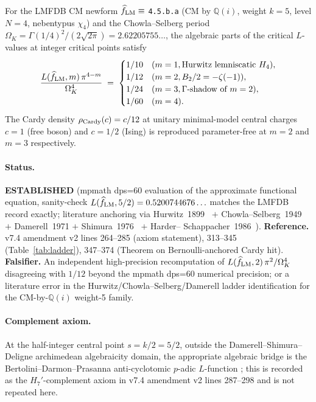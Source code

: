 \begin{axiom*}
For the LMFDB CM newform $\widehat f_{\rm LM} \equiv$
\texttt{4.5.b.a} (CM by $\mathbb{Q}(i)$, weight $k=5$, level $N=4$,
nebentypus $\chi_4$) and the Chowla--Selberg period $\Omega_K =
\Gamma(1/4)^2 / (2\sqrt{2\pi}) = 2.62205755\ldots$, the algebraic parts
of the critical $L$-values at integer critical points satisfy
\[
  \frac{L(\widehat f_{\rm LM},m) \, \pi^{4-m}}{\Omega_K^4} \;=\;
  \begin{cases}
    1/10  & (m=1, \text{Hurwitz lemniscatic } H_4),\\
    1/12  & (m=2, B_2/2 = -\zeta(-1)),\\
    1/24  & (m=3, \Gamma\text{-shadow of } m=2),\\
    1/60  & (m=4).
  \end{cases}
\]
The Cardy density $\rho_{\rm Cardy}(c) = c/12$ at unitary minimal-model
central charges $c=1$ (free boson) and $c=1/2$ (Ising) is reproduced
parameter-free at $m=2$ and $m=3$ respectively.
\end{axiom*}

\paragraph{Status.}  \textbf{ESTABLISHED} (mpmath dps=60 evaluation of
the approximate functional equation, sanity-check
$L(\widehat f_{\rm LM},5/2) = 0.5200744676\ldots$ matches the LMFDB
record exactly; literature anchoring via Hurwitz~1899~\cite{Hurwitz1899}
$+$ Chowla--Selberg~1949~\cite{ChowSel49} $+$ Damerell~1971
\cite{Damerell71} $+$ Shimura~1976~\cite{Shimura76} $+$ Harder--%
Schappacher~1986~\cite{HS86}).  \textbf{Reference.}  v7.4 amendment v2
lines 264--285 (axiom statement), 313--345 (Table~\ref{tab:ladder}),
347--374 (Theorem on Bernoulli-anchored Cardy hit).
\textbf{Falsifier.}  An independent high-precision recomputation of
$L(\widehat f_{\rm LM}, 2)\,\pi^2 / \Omega_K^4$ disagreeing with $1/12$
beyond the mpmath dps=60 numerical precision; or a literature error in
the Hurwitz/Chowla--Selberg/Damerell ladder identification for the
CM-by-$\mathbb{Q}(i)$ weight-5 family.

\paragraph{Complement axiom.}  At the half-integer central point $s =
k/2 = 5/2$, outside the Damerell--Shimura--Deligne archimedean
algebraicity domain, the appropriate algebraic bridge is the
Bertolini--Darmon--Prasanna anti-cyclotomic $p$-adic $L$-function
\cite{BDP13}; this is recorded as the $H_7'$-complement axiom in v7.4
amendment v2 lines 287--298 and is not repeated here.

